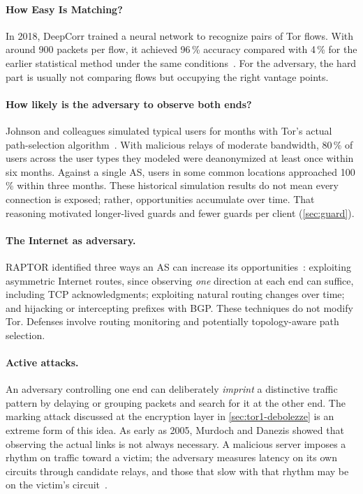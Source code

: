 \paragraph{How Easy Is Matching?} In 2018, DeepCorr trained a neural network to recognize pairs of Tor flows. With around 900 packets per flow, it achieved 96\,\% accuracy compared with 4\,\% for the earlier statistical method under the same conditions~\cite{nasr2018deepcorr}. For the adversary, the hard part is usually not comparing flows but occupying the right vantage points.

\paragraph{How likely is the adversary to observe both ends?} Johnson and colleagues simulated typical users for months with Tor's actual path-selection algorithm~\cite{johnson2013users}. With malicious relays of moderate bandwidth, 80\,\% of users across the user types they modeled were deanonymized at least once within six months. Against a single AS, users in some common locations approached 100\,\% within three months. These historical simulation results do not mean every connection is exposed; rather, opportunities accumulate over time. That reasoning motivated longer-lived guards and fewer guards per client (\cref{sec:guard}).

\paragraph{The Internet as adversary.} RAPTOR identified three ways an AS can increase its opportunities~\cite{sun2015raptor}: exploiting asymmetric Internet routes, since observing \emph{one} direction at each end can suffice, including TCP acknowledgments; exploiting natural routing changes over time; and hijacking or intercepting prefixes with BGP. These techniques do not modify Tor. Defenses involve routing monitoring and potentially topology-aware path selection.

\paragraph{Active attacks.} An adversary controlling one end can deliberately \emph{imprint} a distinctive traffic pattern by delaying or grouping packets and search for it at the other end. The marking attack discussed at the encryption layer in \cref{sec:tor1-debolezze} is an extreme form of this idea. As early as 2005, Murdoch and Danezis showed that observing the actual links is not always necessary. A malicious server imposes a rhythm on traffic toward a victim; the adversary measures latency on its own circuits through candidate relays, and those that slow with that rhythm may be on the victim's circuit~\cite{murdoch2005lowcost}.

